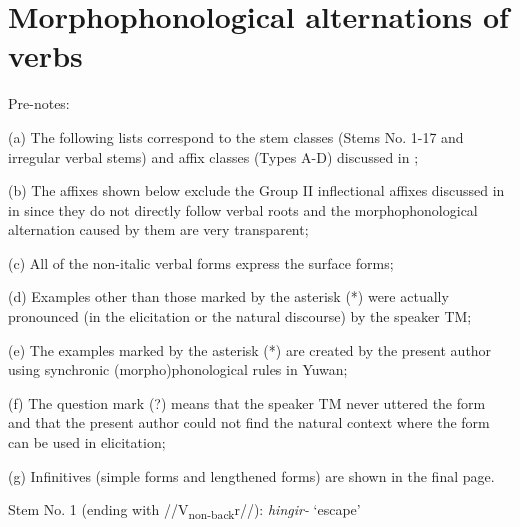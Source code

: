 \chapter{Morphophonological alternations of verbs}
\hypertarget{RefHeadingToc395697264}{}

Pre-notes:

(a)  The following lists correspond to the stem classes (Stems No. 1-17 and irregular verbal stems) and affix classes (Types A-D) discussed in ;

(b)  The affixes shown below exclude the Group II inflectional affixes discussed in  in  since they do not directly follow verbal roots and the morphophonological alternation caused by them are very transparent;

(c)  All of the non-italic verbal forms express the surface forms;

(d)  Examples other than those marked by the asterisk (*) were actually pronounced (in the elicitation or the natural discourse) by the speaker TM;

(e)  The examples marked by the asterisk (*) are created by the present author using synchronic (morpho)phonological rules in Yuwan;

(f)  The question mark (?) means that the speaker TM never uttered the form and that the present author could not find the natural context where the form can be used in elicitation;

(g)  Infinitives (simple forms and lengthened forms) are shown in the final page.

Stem No. 1 (ending with //V\textsubscript{non-back}r//): \textit{hingir-} ‘escape’

\tablefirsthead{}

